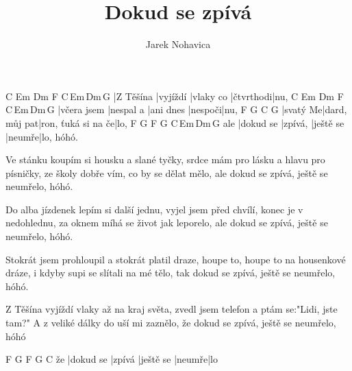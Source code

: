 \documentclass{song}
\title{Dokud se zpívá}
\author{Jarek Nohavica}
\begin{document}
\strophe
C         Em       Dm        F         C\,Em\,Dm\,G
|Z Těšína |vyjíždí |vlaky co |čtvrthodi|nu,
C           Em        Dm        F       C\,Em\,Dm\,G
|včera jsem |nespal a |ani dnes |nespoči|nu,
F        G             C                  G
|svatý Me|dard, můj pat|ron, ťuká si na če|lo,
    F         G       F         G      C\,Em\,Dm\,G
ale |dokud se |zpívá, |ještě se |neumře|lo, hóhó.
\endstrophe

\strophe*
Ve stánku koupím si housku a slané tyčky,
srdce mám pro lásku a hlavu pro písničky,
ze školy dobře vím, co by se dělat mělo,
ale dokud se zpívá, ještě se neumřelo, hóhó.
\endstrophe

\strophe*
Do alba jízdenek lepím si další jednu,
vyjel jsem před chvílí, konec je v nedohlednu,
za oknem míhá se život jak leporelo,
ale dokud se zpívá, ještě se neumřelo, hóhó.
\endstrophe

\strophe*
Stokrát jsem prohloupil a stokrát platil draze,
houpe to, houpe to na housenkové dráze,
i kdyby supi se slítali na mé tělo,
tak dokud se zpívá, ještě se neumřelo, hóhó.
\endstrophe

\strophe*
Z Těšína vyjíždí vlaky až na kraj světa,
zvedl jsem telefon a ptám se:"Lidi, jste tam?"
A z veliké dálky do uší mi zaznělo,
že dokud se zpívá, ještě se neumřelo, hóhó
\endstrophe

\strophe
   F         G      F         G      C
že |dokud se |zpívá |ještě se |neumře|lo
\endstrophe
\end{document}
